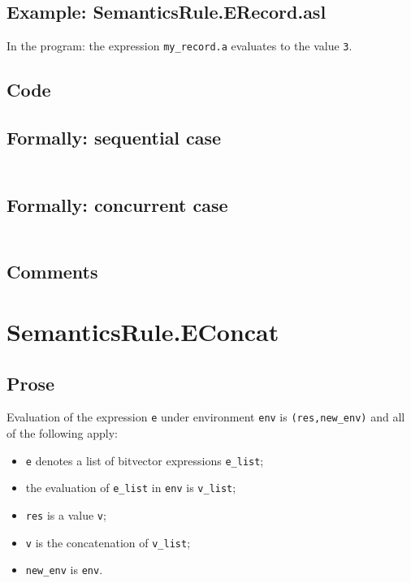 \documentclass{book}
\begin{document}
  \subsection{Example: SemanticsRule.ERecord.asl}
    In the program:
    the expression \texttt{my\_record.a} evaluates to the value \texttt{3}.

  \subsection{Code}

  \subsection{Formally: sequential case}
  \begin{align}
  \end{align} 

  \subsection{Formally: concurrent case}
  \begin{align}
  \end{align} 

  \subsection{Comments}

\section{SemanticsRule.EConcat \label{sec:SemanticsRule.EConcat}}

  \subsection{Prose}
  Evaluation of the expression \texttt{e} under environment \texttt{env} is
  \texttt{(res,new\_env)} and all of the following apply:
  \begin{itemize}
  \item \texttt{e} denotes a list of bitvector expressions \texttt{e\_list};
  \item the evaluation of \texttt{e\_list} in \texttt{env} is \texttt{v\_list};
  \item \texttt{res} is a value \texttt{v};
  \item \texttt{v} is the concatenation of \texttt{v\_list};
  \item \texttt{new\_env} is \texttt{env}.
  \end{itemize}
\end{document}
